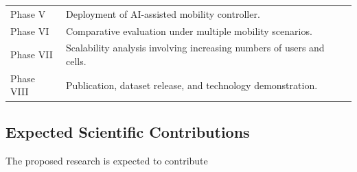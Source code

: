 \documentclass[12pt,a4paper]{article}\usepackage[a4paper,margin=1in]{geometry}\usepackage{graphicx}\usepackage{longtable}\usepackage{booktabs}\usepackage{hyperref}\usepackage{enumitem}\usepackage{amsmath}\usepackage{tikz}\usepackage{pgfgantt}\usepackage{setspace}\setstretch{1.15}\usetikzlibrary{positioning,arrows.meta,shapes.geometric}
\begin{document}
\begin{table}[h]
\begin{tabular}{p{3cm}p{9cm}}
			Phase V
			
			&
			
			Deployment of AI-assisted mobility controller.
			
			\\
			
			Phase VI
			
			&
			
			Comparative evaluation under multiple mobility scenarios.
			
			\\
			
			Phase VII
			
			&
			
			Scalability analysis involving increasing numbers of users and cells.
			
			\\
			
			Phase VIII
			
			&
			
			Publication, dataset release, and technology demonstration.
			
			\\
			
			\bottomrule
			
		\end{tabular}
		
	\end{table}
	
	
	\subsection{Expected Scientific Contributions}
	
	The proposed research is expected to contribute
	
\end{document}
